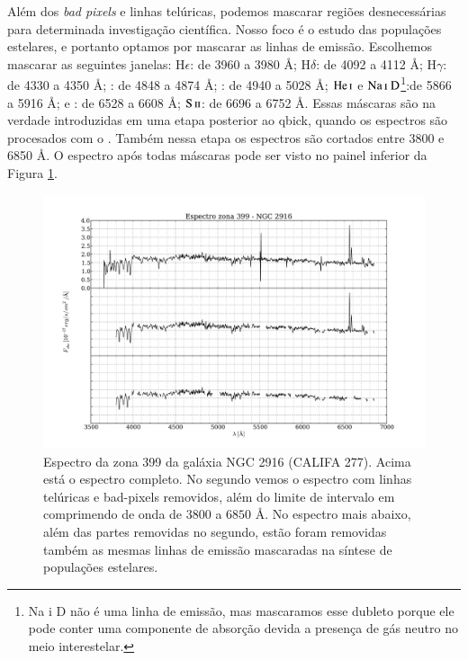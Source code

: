 Além dos {\em bad pixels} e linhas telúricas, podemos mascarar regiões desnecessárias para determinada investigação
científica. Nosso foco é o estudo das populações estelares, e portanto optamos por mascarar as linhas de emissão.
Escolhemos mascarar as seguintes janelas: $\mathrm{H}\epsilon$: de 3960 a 3980 \AA; $\mathrm{H}\delta$: de 4092 a 4112
\AA; $\mathrm{H}\gamma$: de 4330 a 4350 \AA; \Hbeta: de 4848 a 4874 \AA; \oIII: de 4940 a 5028 \AA;
$\mathrm{He\,\textsc{i}}$ e $\mathrm{Na\,\textsc{i}\ D}$\footnote{Na {\sc i} D não é uma linha de emissão, mas
mascaramos esse dubleto porque ele pode conter uma componente de absorção devida a presença de gás neutro no meio
interestelar.}:de 5866 a 5916 \AA; \Halpha e \nII: de 6528 a 6608 \AA; $\mathrm{S\,\textsc{ii}}$: de 6696 a 6752 \AA.
Essas máscaras são na verdade introduzidas em uma etapa posterior ao {\sc qbick}, quando os espectros são procesados com
o \starlight. Também nessa etapa os espectros são cortados entre 3800 e 6850 \AA. O espectro após todas máscaras pode
ser visto no painel inferior da Figura \ref{fig:checkmask}.

\begin{figure}
    \includegraphics[width=1.0\textwidth]{figuras/K0277-constant_inital_mask-399.pdf}
    \caption[Exemplo de máscaras em um espectro do cubo de dados.]
    {Espectro da zona 399 da galáxia NGC 2916 (CALIFA 277). Acima está o espectro completo. No segundo vemos o espectro
    com linhas telúricas e bad-pixels removidos, além do limite de intervalo em comprimendo de onda de $3800$ a $6850$
    \AA. No espectro mais abaixo, além das partes removidas no segundo, estão foram removidas também as mesmas linhas de
    emissão mascaradas na síntese de populações estelares.}
    \label{fig:checkmask}
\end{figure}

